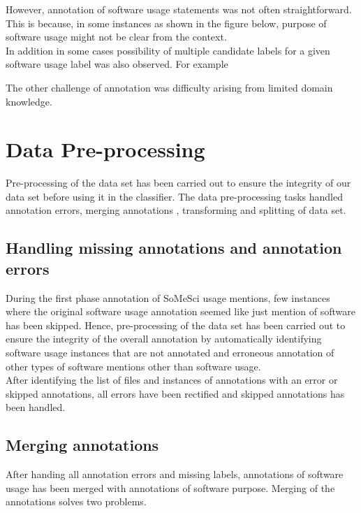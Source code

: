 However, annotation of software usage statements was not often straightforward. This is because, in some instances as shown in the figure below, purpose of software usage might not be clear from the context.\\

In addition in some cases possibility of multiple candidate labels for a given software usage label was also observed. For example  

The other challenge of annotation was difficulty arising from limited domain knowledge. 

\section{Data Pre-processing}
\label{sec:dataset:preprocessing}
Pre-processing of the data set has been carried out to ensure the integrity of our data set before using it in the classifier. The data pre-processing tasks handled annotation errors, merging annotations , transforming and splitting of data set. 

\subsection{Handling missing annotations and annotation errors }
\label{subsec:dataset:preprocessing:handlingerrors}

During the first phase  annotation of SoMeSci usage mentions, few instances where  the original software usage annotation seemed like just mention of software has been skipped. Hence, pre-processing of the data set has been carried out to ensure the integrity of the overall annotation by automatically identifying software usage instances that are not annotated and erroneous annotation of other types of software mentions other than software usage. \\

After identifying the list of files and instances of annotations with an error or skipped annotations, all errors have been rectified and skipped annotations has been handled.


\subsection{Merging annotations}
\label{subsec:dataset:preprocessing:Merging}


After handing all annotation errors and missing labels, annotations of software usage has been merged with annotations of software purpose. Merging of the annotations solves two problems. \\

